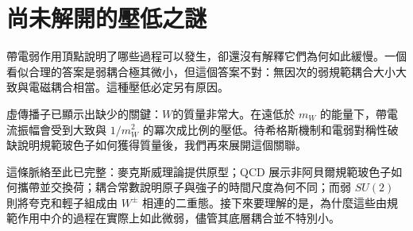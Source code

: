 \section{尚未解開的壓低之謎}

帶電弱作用頂點說明了哪些過程可以發生，卻還沒有解釋它們為何如此緩慢。一個看似合理的答案是弱耦合極其微小，但這個答案不對：無因次的弱規範耦合大小大致與電磁耦合相當。這種壓低必定另有原因。

虛傳播子已顯示出缺少的關鍵：\(W\)的質量非常大。在遠低於 \(m_W\) 的能量下，帶電流振幅會受到大致與 \(1/m_W^2\) 的冪次成比例的壓低。待希格斯機制和電弱對稱性破缺說明規範玻色子如何獲得質量後，我們再來展開這個關聯。

\begin{classroomqa}
\end{classroomqa}

這條脈絡至此已完整：麥克斯威理論提供原型；QCD 展示非阿貝爾規範玻色子如何攜帶並交換荷；耦合常數說明原子與強子的時間尺度為何不同；而弱 \(SU(2)\) 則將夸克和輕子組成由 \(W^\pm\) 相連的二重態。接下來要理解的是，為什麼這些由規範作用中介的過程在實際上如此微弱，儘管其底層耦合並不特別小。